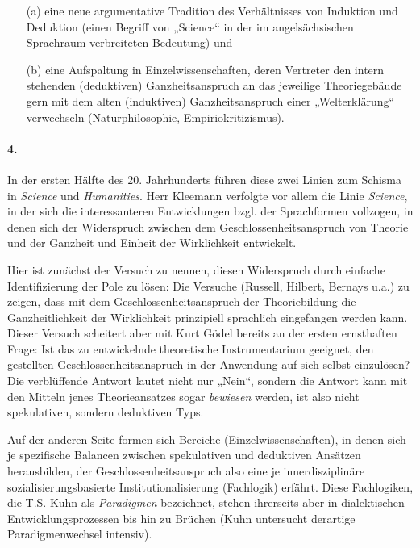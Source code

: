 \documentclass[11pt,a4paper]{article}
\begin{document}
\begin{enumerate}
\item[(a)] eine neue argumentative Tradition des Verhältnisses von Induktion
  und Deduktion (einen Begriff von „Science“ in der im angelsächsischen
  Sprachraum verbreiteten Bedeutung) und
\item[(b)] eine Aufspaltung in Einzelwissenschaften, deren Vertreter den
  intern stehenden (deduktiven) Ganzheitsanspruch an das jeweilige
  Theoriegebäude gern mit dem alten (induktiven) Ganzheitsanspruch einer
  „Welterklärung“ verwechseln (Naturphilosophie, Empiriokritizismus).
\end{enumerate}

\paragraph{4.}
In der ersten Hälfte des 20. Jahrhunderts führen diese zwei Linien zum Schisma
in \emph{Science} und \emph{Humanities}. Herr Kleemann verfolgte vor allem die
Linie \emph{Science}, in der sich die interessanteren Entwicklungen bzgl. der
Sprachformen vollzogen, in denen sich der Widerspruch zwischen dem
Geschlossenheitsanspruch von Theorie und der Ganzheit und Einheit der
Wirklichkeit entwickelt.

Hier ist zunächst der Versuch zu nennen, diesen Widerspruch durch einfache
Identifizierung der Pole zu lösen: Die Versuche (Russell, Hilbert, Bernays
u.a.) zu zeigen, dass mit dem Geschlossenheitsanspruch der Theoriebildung die
Ganzheitlichkeit der Wirklichkeit prinzipiell sprachlich eingefangen werden
kann. Dieser Versuch scheitert aber mit Kurt Gödel bereits an der ersten
ernsthaften Frage: Ist das zu entwickelnde theoretische Instrumentarium
geeignet, den gestellten Geschlossenheitsanspruch in der Anwendung auf sich
selbst einzulösen?  Die verblüffende Antwort lautet nicht nur „Nein“, sondern
die Antwort kann mit den Mitteln jenes Theorieansatzes sogar \emph{bewiesen}
werden, ist also nicht spekulativen, sondern deduktiven Typs.

Auf der anderen Seite formen sich Bereiche (Einzelwissenschaften), in denen
sich je spezifische Balancen zwischen spekulativen und deduktiven Ansätzen
herausbilden, der Geschlossenheitsanspruch also eine je innerdisziplinäre
sozialisierungsbasierte Institutionalisierung (Fachlogik) erfährt. Diese
Fachlogiken, die T.S. Kuhn als \emph{Paradigmen} bezeichnet, stehen ihrerseits
aber in dialektischen Entwicklungsprozessen bis hin zu Brüchen (Kuhn
untersucht derartige Paradigmenwechsel intensiv).
\end{document}
